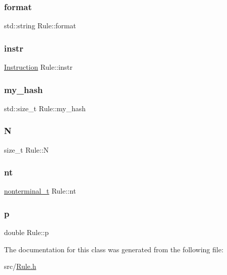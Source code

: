 \mbox{\label{class_rule_aa48c15aaaf5242afea0439607f2a2177}} 
\subsubsection{\texorpdfstring{format}{format}}
{\footnotesize\ttfamily std\+::string Rule\+::format}

\mbox{\label{class_rule_a367e578f5e1427ef04d1d77477565c67}} 
\subsubsection{\texorpdfstring{instr}{instr}}
{\footnotesize\ttfamily \hyperlink{class_instruction}{Instruction} Rule\+::instr}

\mbox{\label{class_rule_af2d873c97e2de425f14a5a980dbcc104}} 
\subsubsection{\texorpdfstring{my\+\_\+hash}{my\_hash}}
{\footnotesize\ttfamily std\+::size\+\_\+t Rule\+::my\+\_\+hash\hspace{0.3cm}{\ttfamily [protected]}}

\mbox{\label{class_rule_a0a2a742af39b60831ad1ac5eb5ba7498}} 
\subsubsection{\texorpdfstring{N}{N}}
{\footnotesize\ttfamily size\+\_\+t Rule\+::N}

\mbox{\label{class_rule_a980385e76137909454bd6a585bd2e138}} 
\subsubsection{\texorpdfstring{nt}{nt}}
{\footnotesize\ttfamily \hyperlink{_nonterminal_8h_a5c1f658dc7560600a16d22408bd716ca}{nonterminal\+\_\+t} Rule\+::nt}

\mbox{\label{class_rule_acd7e4d41d59dec76f60ca16238ab391a}} 
\subsubsection{\texorpdfstring{p}{p}}
{\footnotesize\ttfamily double Rule\+::p}



The documentation for this class was generated from the following file\+:\begin{DoxyCompactItemize}
\item 
src/\hyperlink{_rule_8h}{Rule.\+h}\end{DoxyCompactItemize}
